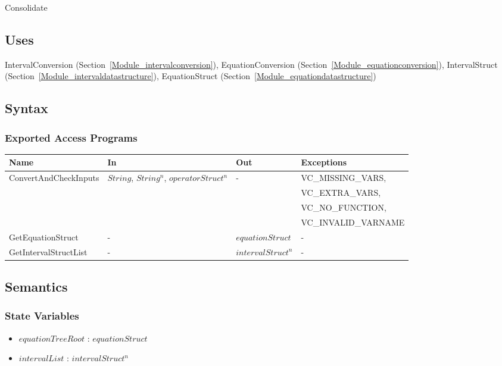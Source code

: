 \documentclass[12pt, titlepage]{article}
\begin{document}
Consolidate

\subsection{Uses}

IntervalConversion (Section~\ref{Module_intervalconversion}), 
EquationConversion (Section~\ref{Module_equationconversion}), IntervalStruct 
(Section~\ref{Module_intervaldatastructure}), EquationStruct 
(Section~\ref{Module_equationdatastructure})


\subsection{Syntax}

\subsubsection{Exported Access Programs}

\begin{center}
	\begin{tabular}{p{4.3cm} p{2.7cm} p{3cm} p{4.3cm}}
		\hline
		\textbf{Name} & \textbf{In} & \textbf{Out} & \textbf{Exceptions} \\
		\hline
		\multirow{4}{4.3cm}{ConvertAndCheckInputs} & 
		\multirow{4}{2.3cm}{$String$, $String^n$, $operatorStruct^n$} & 
		\multirow{4}{3cm}{-} & VC\_MISSING\_VARS, \\
		& & & VC\_EXTRA\_VARS, \\
		& & & VC\_NO\_FUNCTION, \\
		& & & VC\_INVALID\_VARNAME \\
		GetEquationStruct & - & $equationStruct$ & - \\
		GetIntervalStructList & - & $intervalStruct^n$ & - \\
		\hline
	\end{tabular}
\end{center}

\subsection{Semantics}

\subsubsection{State Variables}

\begin{itemize}
	\item $equationTreeRoot$ : $equationStruct$
	\item $intervalList$ : $intervalStruct^n$
\end{itemize}
\end{document}
